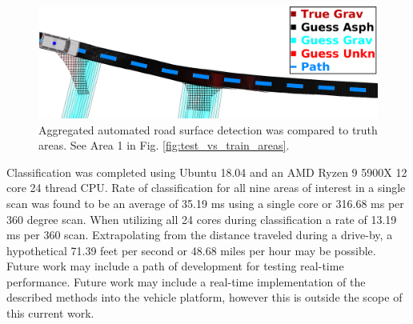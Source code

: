 \documentclass[journal,onecolumn]{IEEEtran}
\begin{document}
		\begin{figure}[H]
			\centering
			\includegraphics[width=0.95\linewidth]{figures/db1_conf_elim_auto_guess_mca}
			\caption[Aggregated Automated Road Surface Detection]{Aggregated automated road surface detection was compared to truth areas. See Area 1 in Fig. \ref{fig:test_vs_train_areas}.}
			\label{fig:guess_grav_intersect}
		\end{figure}

		{Classification was completed using Ubuntu 18.04 and an AMD Ryzen 9 5900X 12 core 24 thread CPU. Rate of classification for all nine areas of interest in a single scan was found to be an average of 35.19 ms using a single core or 316.68 ms per 360 degree scan. When utilizing all 24 cores during classification a rate of 13.19 ms per 360 scan. Extrapolating from the distance traveled during a drive-by, a hypothetical 71.39 feet per second or 48.68 miles per hour may be possible. Future work may include a path of development for testing real-time performance. Future work may include a real-time implementation of the described methods into the vehicle platform, however this is outside the scope of this current work. }

\end{document}
